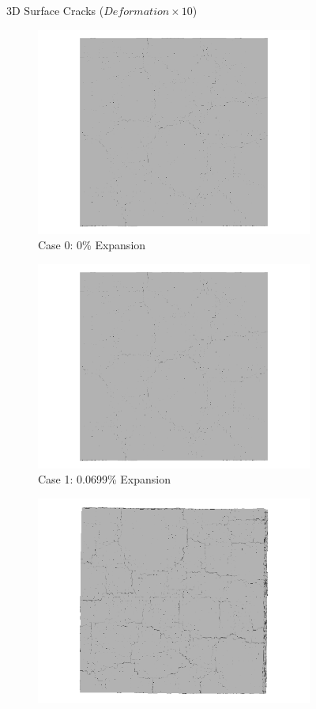 \begin{figure}[!h]
  \caption{3D Surface Cracks ($Deformation \times 10$)}
  \label{fig:ASR_A15P75_3D}
\end{figure}

\begin{figure}[!h]
\centering

    \begin{subfigure}{.5\textwidth}
      \centering
      \includegraphics[width=.8\linewidth]{Files/exp_3D/ASR/A15P75_1_3ds.png}
    \caption{Case 0: 0\% Expansion}
    \end{subfigure}%
    \begin{subfigure}{.5\textwidth}
      \centering
      \includegraphics[width=.8\linewidth]{Files/exp_3D/ASR/A15P75_1_3ds.png}
    \caption{Case 1: 0.0699\% Expansion}
    \end{subfigure}
    \begin{subfigure}{.5\textwidth}
      \centering
      \includegraphics[width=.8\linewidth]{Files/exp_3D/ASR/A15P75_2_3ds.png}

\end{subfigure}
\end{figure}
